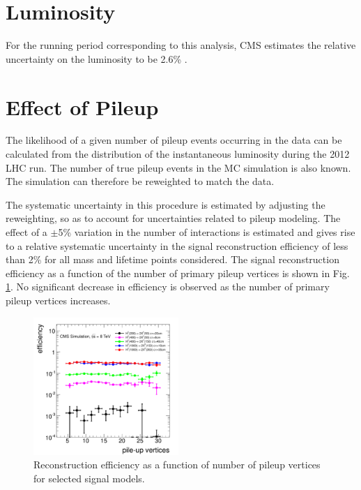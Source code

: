 \section{Luminosity}
For the running period corresponding to this analysis, CMS estimates the relative uncertainty on the luminosity to be 2.6\% \cite{CMS-PAS-LUM-13-001}.

\section{Effect of Pileup}
The likelihood of a given number of pileup events occurring in the data can be calculated from the distribution
 of the instantaneous luminosity during the 2012 LHC run. The number of true pileup events in the MC
 simulation is also known. The simulation can therefore be reweighted to match the data. 

The systematic uncertainty in this procedure is estimated by adjusting the reweighting, so as to account
 for uncertainties related to pileup modeling. 
The effect of a $\pm$5\% variation in the number of interactions is estimated and gives rise 
to a relative systematic uncertainty in the signal reconstruction efficiency 
of less than 2\% for all mass and lifetime points considered. The signal reconstruction efficiency as
a function of the number of primary pileup vertices is shown in Fig. \ref{fig:effPU}. No significant
decrease in efficiency is observed as the number of primary pileup vertices increases.

\begin{figure}[htbp]
\centering
\includegraphics[width=0.49\textwidth]{plots/signal/effPU.pdf}
\caption{Reconstruction efficiency as a function of number of pileup vertices for selected
signal models.\label{fig:effPU}}
\end{figure}

